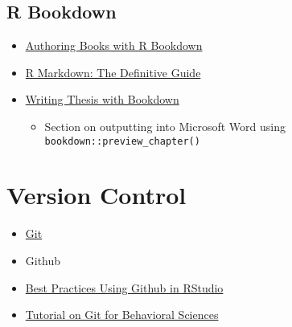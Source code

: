\documentclass[]{book}
\providecommand{\tightlist}{%
  \setlength{\itemsep}{0pt}\setlength{\parskip}{0pt}}
\begin{document}
\hypertarget{r-bookdown}{%
\section{R Bookdown}\label{r-bookdown}}

\begin{itemize}
\item
  \href{https://bookdown.org/yihui/bookdown/}{Authoring Books with R Bookdown}
\item
  \href{https://bookdown.org/yihui/rmarkdown/}{R Markdown: The Definitive Guide}
\item
  \href{https://eddjberry.netlify.com/post/writing-your-thesis-with-bookdown/}{Writing Thesis with Bookdown}

  \begin{itemize}
  \tightlist
  \item
    Section on outputting into Microsoft Word using \texttt{bookdown::preview\_chapter()}
  \end{itemize}
\end{itemize}

\hypertarget{version-control}{%
\chapter*{Version Control}\label{version-control}}

\begin{itemize}
\item
  \href{https://git-scm.com/downloads}{Git}
\item
  Github
\item
  \href{http://r-pkgs.had.co.nz/git.html}{Best Practices Using Github in RStudio}
\item
  \href{https://vuorre.netlify.com/pdf/2017-Vuorre-Curley.pdf}{Tutorial on Git for Behavioral Sciences}
\end{itemize}


\end{document}
